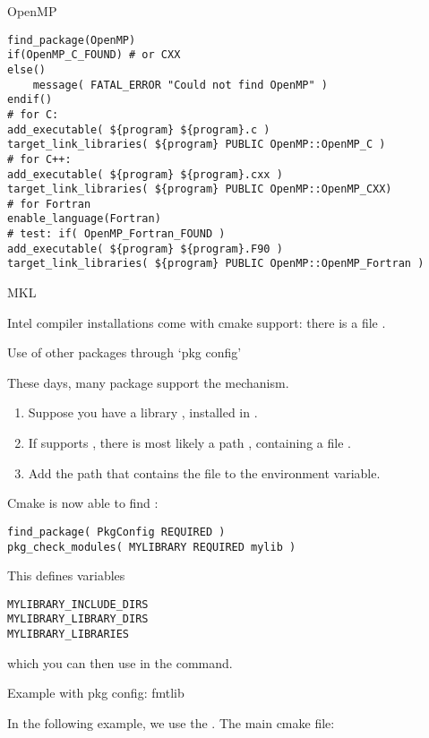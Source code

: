  {OpenMP}

\begin{lstlisting}
find_package(OpenMP)
if(OpenMP_C_FOUND) # or CXX
else()
	message( FATAL_ERROR "Could not find OpenMP" )
endif()
# for C:
add_executable( ${program} ${program}.c )
target_link_libraries( ${program} PUBLIC OpenMP::OpenMP_C )
# for C++:
add_executable( ${program} ${program}.cxx )
target_link_libraries( ${program} PUBLIC OpenMP::OpenMP_CXX)
# for Fortran
enable_language(Fortran)
# test: if( OpenMP_Fortran_FOUND )
add_executable( ${program} ${program}.F90 )
target_link_libraries( ${program} PUBLIC OpenMP::OpenMP_Fortran )
\end{lstlisting}

 {MKL}

Intel compiler installations come with cmake support:
there is a file .



 {Use of other packages through `pkg config'}

These days, many package support the  mechanism.
\begin{enumerate}
\item Suppose you have a library , installed in .
\item If  supports , there is most likely a path
  , containing a file .
\item Add the path that contains the  file to the
   environment variable.
\end{enumerate}
Cmake is now able to find :
\begin{lstlisting}
find_package( PkgConfig REQUIRED )
pkg_check_modules( MYLIBRARY REQUIRED mylib )
\end{lstlisting}

This defines variables
\begin{verbatim}
MYLIBRARY_INCLUDE_DIRS
MYLIBRARY_LIBRARY_DIRS
MYLIBRARY_LIBRARIES
\end{verbatim}
which you can then use in the 
command.

 {Example with pkg config: fmtlib}

In the following example, we use the .
The main cmake file:
%


